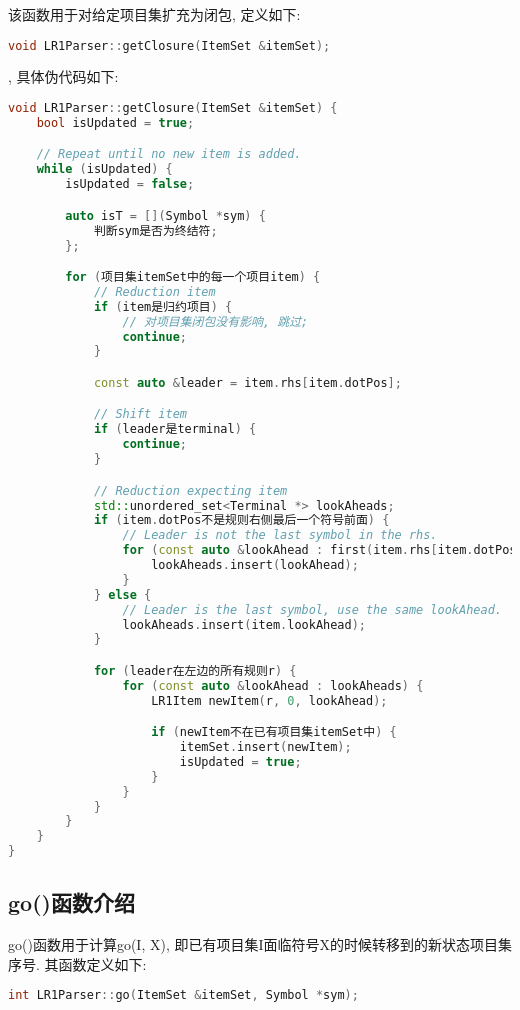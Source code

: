 该函数用于对给定项目集扩充为闭包, 定义如下:
\begin{lstlisting}[language=c++]
void LR1Parser::getClosure(ItemSet &itemSet);
\end{lstlisting}
, 具体伪代码如下:
\begin{lstlisting}[language=c++]
void LR1Parser::getClosure(ItemSet &itemSet) {
    bool isUpdated = true;

    // Repeat until no new item is added.
    while (isUpdated) {
        isUpdated = false;

        auto isT = [](Symbol *sym) {
            判断sym是否为终结符;
        };

        for (项目集itemSet中的每一个项目item) {
            // Reduction item
            if (item是归约项目) {
                // 对项目集闭包没有影响, 跳过;
                continue;
            }

            const auto &leader = item.rhs[item.dotPos];

            // Shift item
            if (leader是terminal) {
                continue;
            }

            // Reduction expecting item
            std::unordered_set<Terminal *> lookAheads;
            if (item.dotPos不是规则右侧最后一个符号前面) {
                // Leader is not the last symbol in the rhs.
                for (const auto &lookAhead : first(item.rhs[item.dotPos + 1])) {
                    lookAheads.insert(lookAhead);
                }
            } else {
                // Leader is the last symbol, use the same lookAhead.
                lookAheads.insert(item.lookAhead);
            }

            for (leader在左边的所有规则r) {
                for (const auto &lookAhead : lookAheads) {
                    LR1Item newItem(r, 0, lookAhead);

                    if (newItem不在已有项目集itemSet中) {
                        itemSet.insert(newItem);
                        isUpdated = true;
                    }
                }
            }
        }
    }
}
\end{lstlisting}

\subsection{go()函数介绍}
go()函数用于计算go(I, X), 即已有项目集I面临符号X的时候转移到的新状态项目集序号.
其函数定义如下:
\begin{lstlisting}[language=c++]
int LR1Parser::go(ItemSet &itemSet, Symbol *sym);
\end{lstlisting}

